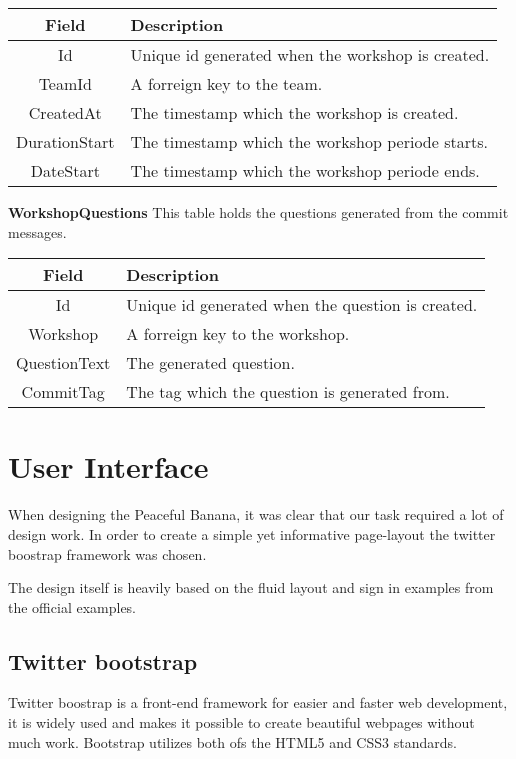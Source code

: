 \vspace{0.5cm}
\begin{tabularx}{\linewidth}{| c | X |}
    \hline
    \rowcolor[gray]{0.8}
    \textbf{Field} & \textbf{Description} \\
    \hline
    Id & Unique id generated when the workshop is created.\\ \hline
   	TeamId & A forreign key to the team.\\ \hline
   	CreatedAt & The timestamp which the workshop is created.\\ \hline
   	DurationStart & The timestamp which the workshop periode starts.\\ \hline
   	DateStart & The timestamp which the workshop periode ends.\\ 
    \hline
\end{tabularx}
\vspace{0.5cm}

\textbf{WorkshopQuestions}
This table holds the questions generated from the commit messages. \\

\vspace{0.5cm}
\begin{tabularx}{\linewidth}{| c | X |}
    \hline
    \rowcolor[gray]{0.8}
    \textbf{Field} & \textbf{Description} \\
    \hline
    Id & Unique id generated when the question is created.\\ \hline
   	Workshop & A forreign key to the workshop.\\ \hline
   	QuestionText & The generated question.\\ \hline
   	CommitTag & The tag which the question is generated from.\\ 
    \hline
\end{tabularx}
\vspace{0.5cm}

\section{User Interface}
When designing the Peaceful Banana, it was clear that our task required a lot of design work. In order to create a simple yet informative page-layout the twitter boostrap framework was chosen.

The design itself is heavily based on the fluid layout and sign in examples from the official examples.

\subsection{Twitter bootstrap}
Twitter boostrap is a front-end framework for easier and faster web development, it is widely used and makes it possible to create beautiful webpages without much work. Bootstrap utilizes both ofs the HTML5 and CSS3 standards.

